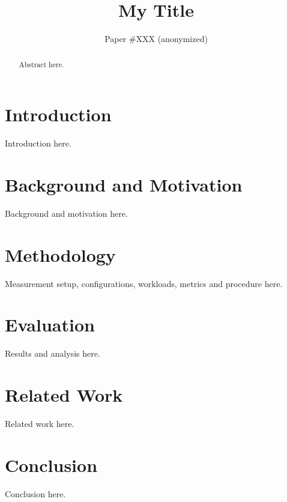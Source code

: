 \documentclass[letterpaper,twocolumn,10pt]{article}
\begin{document}
\date{}

\title{\Large\bf My Title}

\author{Paper \#XXX (anonymized)}

\maketitle

\begin{abstract}
Abstract here.
\end{abstract}

\section{Introduction}
\label{sec:intro}
Introduction here.

\section{Background and Motivation}
\label{sec:background}
Background and motivation here.

\section{Methodology}
\label{sec:method}
Measurement setup, configurations, workloads, metrics and procedure here.

\section{Evaluation}
\label{sec:experiments}
Results and analysis here.

\section{Related Work}
\label{sec:related_work}
Related work here.

\section{Conclusion}
\label{sec:conclusion}
Conclusion here.



\end{document}
